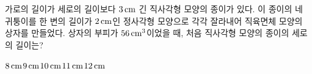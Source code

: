 가로의 길이가 세로의 길이보다 $3\mkern3mu \mathrm{cm}$ 긴 직사각형 모양의 종이가 있다. 이 종이의 네 귀퉁이를 한 변의 길이가 $2\mkern3mu \mathrm{cm}$인 정사각형 모양으로 각각 잘라내어 직육면체 모양의 상자를 만들었다. 상자의 부피가 $56\mkern3mu \mathrm{cm}^3$이었을 때, 처음 직사각형 모양의 종이의 세로의 길이는?
\begin{choices32}{$8\mkern3mu \mathrm{cm}$}{$9\mkern3mu \mathrm{cm}$}{$10\mkern3mu \mathrm{cm}$}{$11\mkern3mu \mathrm{cm}$}{$12\mkern3mu \mathrm{cm}$}\end{choices32}
